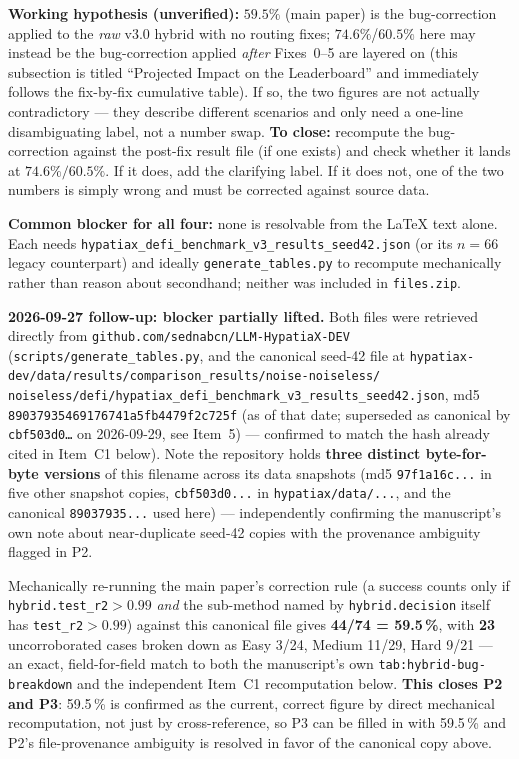 \documentclass[11pt]{article}
\begin{document}
\begin{itemize}
    \textbf{Working hypothesis (unverified):} $59.5\%$ (main paper) is
    the bug-correction applied to the \emph{raw} v3.0 hybrid with no
    routing fixes; $74.6\%$/$60.5\%$ here may instead be the
    bug-correction applied \emph{after} Fixes~0--5 are layered on (this
    subsection is titled ``Projected Impact on the Leaderboard'' and
    immediately follows the fix-by-fix cumulative table). If so, the
    two figures are not actually contradictory — they describe
    different scenarios and only need a one-line disambiguating label,
    not a number swap. \textbf{To close:} recompute the bug-correction
    against the post-fix result file (if one exists) and check whether
    it lands at $74.6\%/60.5\%$. If it does, add the clarifying label.
    If it does not, one of the two numbers is simply wrong and must be
    corrected against source data.
\end{itemize}

\noindent\textbf{Common blocker for all four:} none is resolvable from
the \LaTeX{} text alone. Each needs
\texttt{hypatiax\_defi\_benchmark\_v3\_results\_seed42.json} (or its
$n{=}66$ legacy counterpart) and ideally \texttt{generate\_tables.py} to
recompute mechanically rather than reason about secondhand; neither was
included in \texttt{files.zip}.

\textbf{2026-09-27 follow-up: blocker partially lifted.} Both files were
retrieved directly from \texttt{github.com/sednabcn/LLM-HypatiaX-DEV}
(\texttt{scripts/generate\_tables.py}, and the canonical seed-42 file at
\texttt{hypatiax-dev/data/results/comparison\_results/noise-noiseless/}
\texttt{noiseless/defi/hypatiax\_defi\_benchmark\_v3\_results\_seed42.json},
md5 \texttt{89037935469176741a5fb4479f2c725f} (as of that date; superseded as canonical by \texttt{cbf503d0\ldots} on 2026-09-29, see Item~5) --- confirmed to match the
hash already cited in Item~C1 below). Note the repository holds
\textbf{three distinct byte-for-byte versions} of this filename across its
data snapshots (md5 \texttt{97f1a16c...} in five other snapshot copies,
\texttt{cbf503d0...} in \texttt{hypatiax/data/...}, and the canonical
\texttt{89037935...} used here) --- independently confirming the
manuscript's own note about near-duplicate seed-42 copies with the
provenance ambiguity flagged in P2.

Mechanically re-running the main paper's correction rule (a success counts
only if \texttt{hybrid.test\_r2}$>0.99$ \emph{and} the sub-method named by
\texttt{hybrid.decision} itself has \texttt{test\_r2}$>0.99$) against this
canonical file gives \textbf{44/74 = 59.5\,\%}, with \textbf{23} uncorroborated
cases broken down as Easy 3/24, Medium 11/29, Hard 9/21 --- an exact,
field-for-field match to both the manuscript's own
\texttt{tab:hybrid-bug-breakdown} and the independent Item~C1
recomputation below. \textbf{This closes P2 and P3}: 59.5\,\% is confirmed
as the current, correct figure by direct mechanical recomputation, not
just by cross-reference, so P3 can be filled in with 59.5\,\% and P2's
file-provenance ambiguity is resolved in favor of the canonical copy above.
\end{document}
